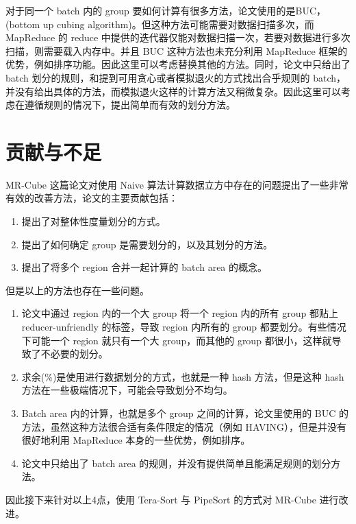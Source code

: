 对于同一个 batch 内的 group 要如何计算有很多方法，论文使用的是BUC，(bottom up cubing algorithm)。但这种方法可能需要对数据扫描多次，而 MapReduce 的 reduce 中提供的迭代器仅能对数据扫描一次，若要对数据进行多次扫描，则需要载入内存中。并且 BUC 这种方法也未充分利用 MapReduce 框架的优势，例如排序功能。因此这里可以考虑替换其他的方法。同时，论文中只给出了batch 划分的规则，和提到可用贪心或者模拟退火的方式找出合乎规则的 batch，并没有给出具体的方法，而模拟退火这样的计算方法又稍微复杂。因此这里可以考虑在遵循规则的情况下，提出简单而有效的划分方法。


\section{贡献与不足}

MR-Cube \cite{nandi2011distributed} 这篇论文对使用 Naive 算法计算数据立方中存在的问题提出了一些非常有效的改善方法，论文的主要贡献包括：

\begin{enumerate}
\item 提出了对整体性度量划分的方式。
\item 提出了如何确定 group 是需要划分的，以及其划分的方法。
\item 提出了将多个 region 合并一起计算的 batch area 的概念。
\end{enumerate}

但是以上的方法也存在一些问题。

\begin{enumerate}
\item 论文中通过 region 内的一个大 group 将一个 region 内的所有 group 都贴上 reducer-unfriendly 的标签，导致 region 内所有的 group 都要划分。有些情况下可能一个 region 就只有一个大 group，而其他的 group 都很小，这样就导致了不必要的划分。
\item 求余(\%)是使用进行数据划分的方式，也就是一种 hash 方法，但是这种 hash 方法在一些极端情况下，可能会导致划分不均匀。
\item Batch area 内的计算，也就是多个 group 之间的计算，论文里使用的 BUC 的方法，虽然这种方法很合适有条件限定的情况（例如 HAVING），但是并没有很好地利用 MapReduce 本身的一些优势，例如排序。
\item 论文中只给出了 batch area 的规则，并没有提供简单且能满足规则的划分方法。
\end{enumerate}

因此接下来针对以上4点，使用 Tera-Sort 与 PipeSort 的方式对 MR-Cube 进行改进。





